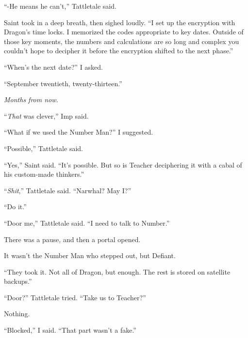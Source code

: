 ``-He means he can't,'' Tattletale said.



Saint took in a deep breath, then sighed loudly.  ``I set up the encryption with Dragon's time locks.  I memorized the codes appropriate to key dates.  Outside of those key moments, the numbers and calculations are so long and complex you couldn't hope to decipher it before the encryption shifted to the next phase.''



``When's the next date?'' I asked.



``September twentieth, twenty-thirteen.''



\emph{Months from now.}



``\emph{That} was clever,'' Imp said.



``What if we used the Number Man?'' I suggested.



``Possible,'' Tattletale said.



``Yes,'' Saint said.  ``It's possible.  But so is Teacher deciphering it with a cabal of his custom-made thinkers.''



``\emph{Shit},'' Tattletale said.  ``Narwhal?  May I?''



``Do it.''



``Door me,'' Tattletale said.  ``I need to talk to Number.''



There was a pause, and then a portal opened.



It wasn't the Number Man who stepped out, but Defiant.



``They took it.  Not all of Dragon, but enough.  The rest is stored on satellite backups.''



``Door?''  Tattletale tried.  ``Take us to Teacher?''



Nothing.



``Blocked,'' I said.  ``That part wasn't a fake.''



